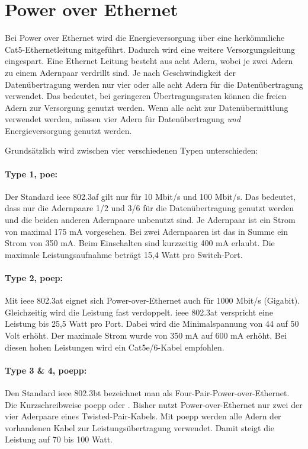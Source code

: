 \wip
\section{Power over Ethernet}
Bei Power over Ethernet wird die Energieversorgung über eine herkömmliche Cat5-Ethernetleitung mitgeführt.
Dadurch wird eine weitere Versorgungsleitung eingespart.
Eine Ethernet Leitung besteht aus acht Adern, wobei je zwei Adern zu einem Adernpaar verdrillt sind.
Je nach Geschwindigkeit der Datenübertragung werden nur vier oder alle acht Adern für die Datenübertragung verwendet.
Das bedeutet, bei geringeren Übertragungsraten können die freien Adern zur Versorgung genutzt werden.
Wenn alle acht zur Datenübermittlung verwendet werden, müssen vier Adern für Datenübertragung \emph{und} Energieversorgung genutzt werden.\par

Grundsätzlich wird zwischen vier verschiedenen Typen unterschieden:
\paragraph{Type 1, \ac{poe}:}
Der Standard \ac{ieee} 802.3af gilt nur für 10 Mbit/s und 100 Mbit/s.
Das bedeutet, dass nur die Adernpaare 1/2 und 3/6 für die Datenübertragung genutzt werden und die beiden anderen Adernpaare unbenutzt sind.
Je Adernpaar ist ein Strom von maximal 175 mA vorgesehen. Bei zwei Adernpaaren ist das in Summe ein Strom von 350 mA.
Beim Einschalten sind kurzzeitig 400 mA erlaubt.
Die maximale Leistungsaufnahme beträgt 15,4 Watt pro Switch-Port.

\paragraph{Type 2, \ac{poep}:}
Mit \ac{ieee} 802.3at eignet sich Power-over-Ethernet auch für 1000 Mbit/s (Gigabit).
Gleichzeitig wird die Leistung fast verdoppelt.
\ac{ieee} 802.3at verspricht eine Leistung bis 25,5 Watt pro Port.
Dabei wird die Minimalspannung von 44 auf 50 Volt erhöht.
Der maximale Strom wurde von 350 mA auf 600 mA erhöht.
Bei diesen hohen Leistungen wird ein Cat5e/6-Kabel empfohlen.

\paragraph{Type 3 \& 4, \ac{poepp}:}
Den Standard \ac{ieee} 802.3bt bezeichnet man als Four-Pair-Power-over-Ethernet. Die Kurzschreibweise \ac{poepp} oder .
Bisher nutzt Power-over-Ethernet nur zwei der vier Aderpaare eines Twisted-Pair-Kabels. Mit \ac{poepp} werden alle Adern der vorhandenen Kabel zur Leistungsübertragung verwendet. Damit steigt die Leistung auf 70 bis 100 Watt.

